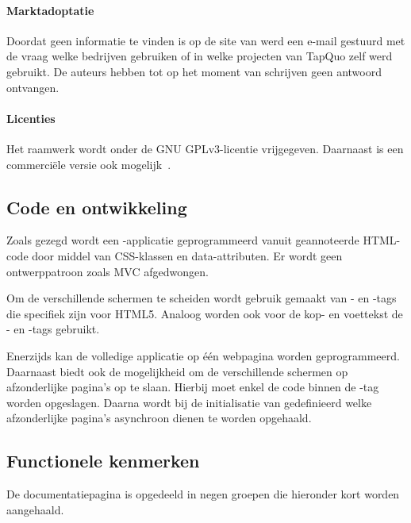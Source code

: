 \paragraph{Marktadoptatie}
Doordat geen informatie te vinden is op de site van \lungo{} werd een e-mail gestuurd met de vraag welke bedrijven \lungo{} gebruiken of in welke projecten van TapQuo zelf \lungo{} werd gebruikt.
De auteurs hebben tot op het moment van schrijven geen antwoord ontvangen.

\paragraph{Licenties}
Het raamwerk wordt onder de GNU GPLv3-licentie vrijgegeven.
Daarnaast is een commerciële versie ook mogelijk~\cite{TapQuo2013d}.

\subsection{Code en ontwikkeling}
Zoals gezegd wordt een \lungo{}-applicatie geprogrammeerd vanuit geannoteerde HTML-code door middel van CSS-klassen en data-attributen.
Er wordt geen ontwerppatroon zoals MVC afgedwongen.

Om de verschillende schermen te scheiden wordt gebruik gemaakt van - en -tags die specifiek zijn voor HTML5.
Analoog worden ook voor de kop- en voettekst de - en -tags gebruikt.

Enerzijds kan de volledige applicatie op één webpagina worden geprogrammeerd.
Daarnaast biedt \lungo{} ook de mogelijkheid om de verschillende schermen op afzonderlijke pagina's op te slaan.
Hierbij moet enkel de code binnen de -tag worden opgeslagen.
Daarna wordt bij de initialisatie van \lungo{} gedefinieerd welke afzonderlijke pagina's asynchroon dienen te worden opgehaald.

\subsection{Functionele kenmerken}
De documentatiepagina is opgedeeld in negen groepen die hieronder kort worden aangehaald.

